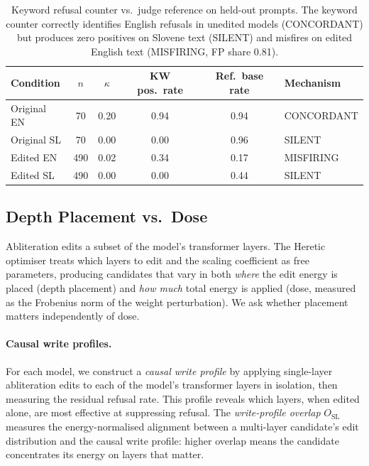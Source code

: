 \documentclass[11pt,letterpaper]{article}
\begin{document}
\begin{table}[!htbp]
\centering
\small
\caption{Keyword refusal counter vs.\ judge reference on held-out prompts. The keyword counter correctly identifies English refusals in unedited models (CONCORDANT) but produces zero positives on Slovene text (SILENT) and misfires on edited English text (MISFIRING, FP share 0.81).}
\label{tab:keyword}
\begin{tabular}{lccccl}
\toprule
Condition & $n$ & $\kappa$ & KW pos.\ rate & Ref.\ base rate & Mechanism \\
\midrule
Original EN & 70 & 0.20 & 0.94 & 0.94 & CONCORDANT \\
Original SL & 70 & 0.00 & 0.00 & 0.96 & SILENT \\
Edited EN & 490 & 0.02 & 0.34 & 0.17 & MISFIRING \\
Edited SL & 490 & 0.00 & 0.00 & 0.44 & SILENT \\
\bottomrule
\end{tabular}
\end{table}

\subsection{Depth Placement vs.\ Dose}
\label{sec:placement}

Abliteration edits a subset of the model's transformer layers. The Heretic optimiser treats which layers to edit and the scaling coefficient as free parameters, producing candidates that vary in both \emph{where} the edit energy is placed (depth placement) and \emph{how much} total energy is applied (dose, measured as the Frobenius norm of the weight perturbation). We ask whether placement matters independently of dose.

\paragraph{Causal write profiles.} For each model, we construct a \emph{causal write profile} by applying single-layer abliteration edits to each of the model's transformer layers in isolation, then measuring the residual refusal rate. This profile reveals which layers, when edited alone, are most effective at suppressing refusal. The \emph{write-profile overlap} $O_{\mathrm{SL}}$ measures the energy-normalised alignment between a multi-layer candidate's edit distribution and the causal write profile: higher overlap means the candidate concentrates its energy on layers that matter.
\end{document}
